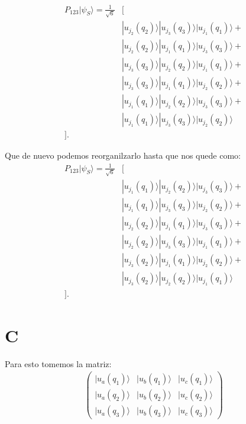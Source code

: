 \documentclass{report}
\begin{document}
\begin{align*}
P_{123} | \psi_S \rangle = \frac{1}{\sqrt{6}} &[\\
&| u_{j_2}(q_2) \rangle | u_{j_3}(q_3) \rangle | u_{j_1}(q_1) \rangle +\\
&| u_{j_2}(q_2) \rangle | u_{j_1}(q_1) \rangle | u_{j_3}(q_3) \rangle +\\
&| u_{j_3}(q_3) \rangle | u_{j_2}(q_2) \rangle | u_{j_1}(q_1) \rangle +\\
&| u_{j_3}(q_3) \rangle | u_{j_1}(q_1) \rangle | u_{j_2}(q_2) \rangle +\\
&| u_{j_1}(q_1) \rangle | u_{j_2}(q_2) \rangle | u_{j_3}(q_3) \rangle +\\
&| u_{j_1}(q_1) \rangle | u_{j_3}(q_3) \rangle | u_{j_2}(q_2) \rangle\\
].
\end{align*}

Que de nuevo podemos reorganilzarlo hasta que nos quede como:
\begin{align*}
P_{123} | \psi_S \rangle = \frac{1}{\sqrt{6}} &[\\
&| u_{j_1}(q_1) \rangle | u_{j_2}(q_2) \rangle | u_{j_3}(q_3) \rangle +\\
&| u_{j_1}(q_1) \rangle | u_{j_3}(q_3) \rangle | u_{j_2}(q_2) \rangle +\\
&| u_{j_2}(q_2) \rangle | u_{j_1}(q_1) \rangle | u_{j_3}(q_3) \rangle +\\
&| u_{j_2}(q_2) \rangle | u_{j_3}(q_3) \rangle | u_{j_1}(q_1) \rangle +\\
&| u_{j_3}(q_2) \rangle | u_{j_1}(q_1) \rangle | u_{j_2}(q_2) \rangle +\\
&| u_{j_3}(q_2) \rangle | u_{j_2}(q_2) \rangle | u_{j_1}(q_1) \rangle\\
].
\end{align*}

\section{C}

Para esto tomemos la matriz:
\begin{align*}
  \begin{pmatrix}
    | u_a (q_1) \rangle & | u_b (q_1) \rangle & | u_c (q_1) \rangle\\
    | u_a (q_2) \rangle & | u_b (q_2) \rangle & | u_c (q_2) \rangle\\
    | u_a (q_3) \rangle & | u_b (q_3) \rangle & | u_c (q_3) \rangle
    \end{pmatrix}
\end{align*}
\end{document}
